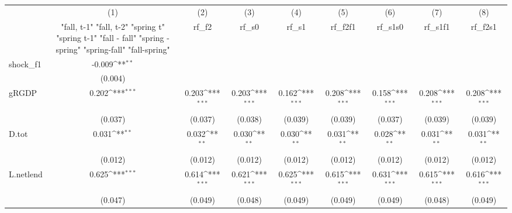 {
\def\sym#1{\ifmmode^{#1}\else\(^{#1}\)\fi}
\begin{tabular}{l*{8}{c}}
\toprule
            &\multicolumn{1}{c}{(1)}&\multicolumn{1}{c}{(2)}&\multicolumn{1}{c}{(3)}&\multicolumn{1}{c}{(4)}&\multicolumn{1}{c}{(5)}&\multicolumn{1}{c}{(6)}&\multicolumn{1}{c}{(7)}&\multicolumn{1}{c}{(8)}\\
            &\multicolumn{1}{c}{  "fall, t-1" "fall, t-2" "spring t" "spring t-1"  "fall - fall" "spring - spring" "spring-fall" "fall-spring" }&\multicolumn{1}{c}{rf\_f2}&\multicolumn{1}{c}{rf\_s0}&\multicolumn{1}{c}{rf\_s1}&\multicolumn{1}{c}{rf\_f2f1}&\multicolumn{1}{c}{rf\_s1s0}&\multicolumn{1}{c}{rf\_s1f1}&\multicolumn{1}{c}{rf\_f2s1}\\
\midrule
shock\_f1    &      -0.009\sym{**} &                     &                     &                     &                     &                     &                     &                     \\
            &     (0.004)         &                     &                     &                     &                     &                     &                     &                     \\
\addlinespace
gRGDP       &       0.202\sym{***}&       0.203\sym{***}&       0.203\sym{***}&       0.162\sym{***}&       0.208\sym{***}&       0.158\sym{***}&       0.208\sym{***}&       0.208\sym{***}\\
            &     (0.037)         &     (0.037)         &     (0.038)         &     (0.039)         &     (0.039)         &     (0.037)         &     (0.039)         &     (0.039)         \\
\addlinespace
D.tot       &       0.031\sym{**} &       0.032\sym{**} &       0.030\sym{**} &       0.030\sym{**} &       0.031\sym{**} &       0.028\sym{**} &       0.031\sym{**} &       0.031\sym{**} \\
            &     (0.012)         &     (0.012)         &     (0.012)         &     (0.012)         &     (0.012)         &     (0.012)         &     (0.012)         &     (0.012)         \\
\addlinespace
L.netlend   &       0.625\sym{***}&       0.614\sym{***}&       0.621\sym{***}&       0.625\sym{***}&       0.615\sym{***}&       0.631\sym{***}&       0.615\sym{***}&       0.616\sym{***}\\
            &     (0.047)         &     (0.049)         &     (0.048)         &     (0.049)         &     (0.049)         &     (0.049)         &     (0.048)         &     (0.049)         \\

\end{tabular}}

